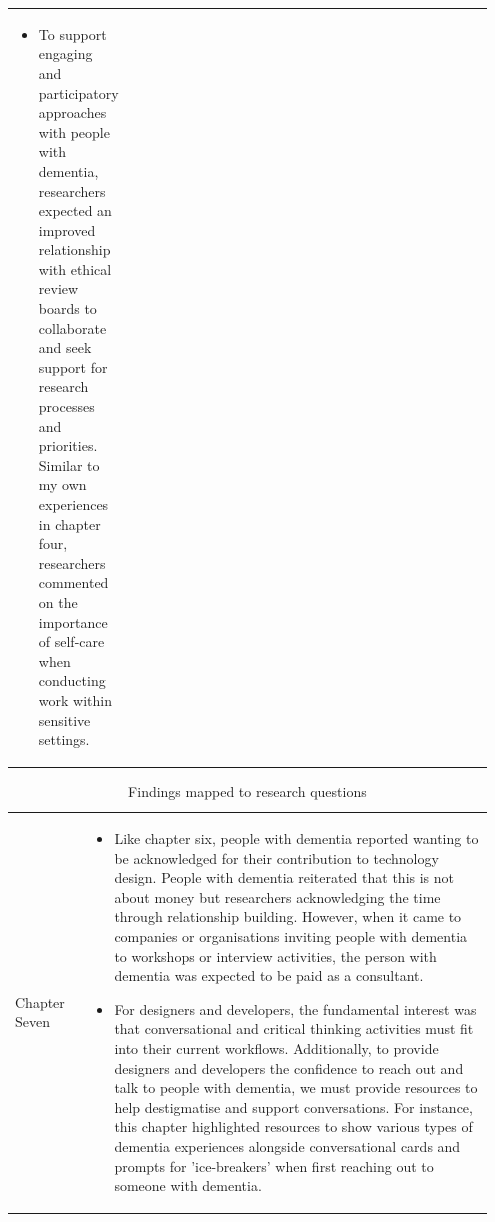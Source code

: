 \begin{table}[htp]
\begin{tabular}{p{0.15\linewidth} | p{0.8\linewidth}}
\begin{itemize}
        \item To support engaging and participatory approaches with people with dementia, researchers expected an improved relationship with ethical review boards to collaborate and seek support for research processes and priorities. Similar to my own experiences in chapter four, researchers commented on the importance of self-care when conducting work within sensitive settings. 
      \end{itemize}
    
    \end{tabular}
\end{table}
\clearpage
\begin{table}[ht]
    \begin{tabular}{p{0.15\linewidth} | p{0.8\linewidth}}
    \\ \hline
    Chapter Seven &
          \begin{itemize}
          \item Like chapter six, people with dementia reported wanting to be acknowledged for their contribution to technology design. People with dementia reiterated that this is not about money but researchers acknowledging the time through relationship building. However, when it came to companies or organisations inviting people with dementia to workshops or interview activities, the person with dementia was expected to be paid as a consultant. 
          \item For designers and developers, the fundamental interest was that conversational and critical thinking activities must fit into their current workflows. Additionally, to provide designers and developers the confidence to reach out and talk to people with dementia, we must provide resources to help destigmatise and support conversations. For instance, this chapter highlighted resources to show various types of dementia experiences alongside conversational cards and prompts for 'ice-breakers' when first reaching out to someone with dementia.

      \end{itemize}
    \\ 
    
    \end{tabular}
    \caption{Findings mapped to research questions}
\end{table}

